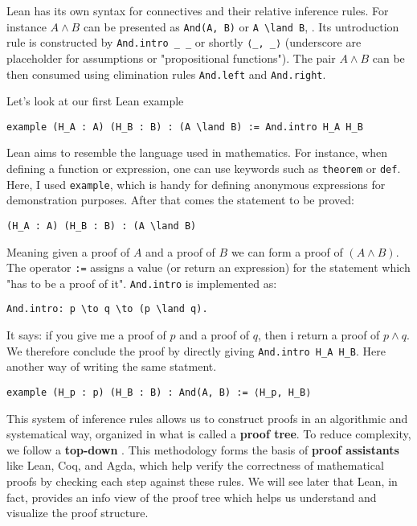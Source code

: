 Lean has its own syntax for connectives and their relative inference rules.
For instance $A \land B$ can be presented as \lstinline[language=lean]|And(A, B)| or \lstinline[language=lean]|A \land B|,
. Its untroduction rule is constructed by
\lstinline[language=lean]|And.intro _ _| or shortly
\lstinline[language=lean]|⟨_, _⟩| (underscore are placeholder for assumptions or "propositional functions").
The pair $A \land B$ can be then consumed using elimination
rules \lstinline[language=lean]|And.left| and \lstinline[language=lean]|And.right|.
\begin{example}\label{ex:conj_intro_2}
  Let's look at our first Lean example
  \begin{lstlisting}[language=lean]
    example (H_A : A) (H_B : B) : (A \land B) := And.intro H_A H_B
  \end{lstlisting}
  Lean aims to resemble the language used in mathematics.
  For instance, when defining a function or expression, one can use keywords such as
  \lstinline[language=lean]|theorem| or \lstinline[language=lean]|def|.
  Here, I used \lstinline[language=lean]|example|, which is handy for defining anonymous expressions
  for demonstration purposes.
  After that comes the statement to be proved:
  \begin{lstlisting}[language=lean]
  (H_A : A) (H_B : B) : (A \land B) 
\end{lstlisting}
  Meaning given a proof of $A$ and a proof of $B$ we can form a proof of $(A \land B)$.
  The operator \lstinline[language=lean]|:=| assigns a value (or return an expression) for the statement which
  "has to be a proof of it".
  \lstinline[language=lean]|And.intro| is implemented as:
  \begin{lstlisting}[language=lean]
  And.intro: p \to q \to (p \land q).
\end{lstlisting}
  It says: if you give me a proof of $p$ and a proof of $q$,
  then i return a proof of $p \land q$.
  We therefore conclude the proof by directly giving
  \lstinline[language=lean]|And.intro H_A H_B|.
  Here another way of writing the same statment.
  \begin{lstlisting}[language=lean]
  example (H_p : p) (H_B : B) : And(A, B) := ⟨H_p, H_B⟩
\end{lstlisting}
\end{example}

This system of inference rules allows us to construct proofs in an
algorithmic and systematical way, organized in what is called a \textbf{proof tree}.
To reduce complexity, we follow a
\textbf{top-down} 
.
This methodology forms the basis of \textbf{proof assistants} like Lean,
Coq, and Agda, which help
verify the correctness of mathematical proofs by checking each step
against these rules.
We will see later that Lean, in fact, provides an info view of the proof tree
which helps us
understand and visualize
the proof structure.


